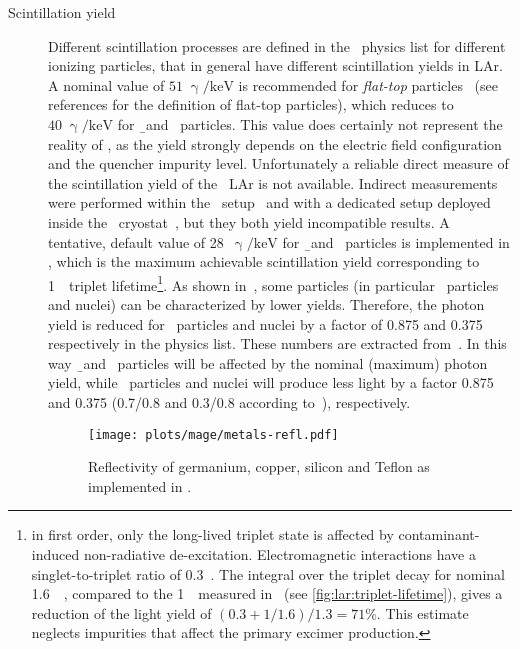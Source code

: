 \begin{description}
  \item[Scintillation yield] Different scintillation processes are defined in the \mage\
    physics list for different ionizing particles, that in general have different
    scintillation yields in LAr. A nominal value of $51\;\upgamma/\text{keV}$ is
    recommended for \emph{flat-top} particles~\cite{Doke2002, Doke1988} (see references for
    the definition of flat-top particles), which reduces to $40\;\upgamma/\text{keV}$ for
    \b\ and \g\ particles. This value does certainly not represent the reality of \gerda,
    as the yield strongly depends on the electric field configuration and the quencher
    impurity level. Unfortunately a reliable direct measure of the scintillation yield of
    the \gerda\ LAr is not available. Indirect measurements were performed within the
    \LArGe\ setup~\cite{Lehnert2016} and with a dedicated setup deployed inside the
    \gerda\ cryostat~\cite{Barros2020}, but they both yield incompatible results. A
    tentative, default value of 28~$\upgamma/\text{keV}$ for \b\ and \g\ particles is
    implemented in \mage, which is the maximum achievable scintillation yield
    corresponding to 1~\mus\ triplet lifetime\footnote{%
      in first order, only the long-lived triplet state is affected by contaminant-induced
      non-radiative de-excitation. Electromagnetic interactions have a singlet-to-triplet
      ratio of 0.3~\cite{Doke2002}. The integral over the triplet decay for nominal
      1.6~\mus~\cite{Doke2002}, compared to the 1~\mus\ measured in \gerda\ (see
      \cref{fig:lar:triplet-lifetime}), gives a reduction of the light yield of $(0.3 +
      1/1.6)/1.3 = 71\%$. This estimate neglects impurities that affect the primary
      excimer production.
    }.
    As shown in~\cite{Doke2002}, some particles (in particular \a\ particles and nuclei)
    can be characterized by lower yields. Therefore, the photon yield is reduced for \a\
    particles and nuclei by a factor of 0.875 and 0.375 respectively in the physics list.
    These numbers are extracted from~\cite{Doke2002}. In this way \b\ and \g\ particles
    will be affected by the nominal (maximum) photon yield, while \a\ particles and nuclei
    will produce less light by a factor 0.875 and 0.375 (0.7/0.8 and 0.3/0.8 according
    to~\cite{Doke2002}), respectively.

    \begin{figure}
      \centering
      \texttt{[image: plots/mage/metals-refl.pdf]}
      \caption{%
        Reflectivity of germanium, copper, silicon and Teflon as implemented in \mage.
      }\label{fig:bkg:lar:ph2:mage:metals-refl}
    \end{figure}


\end{description}
